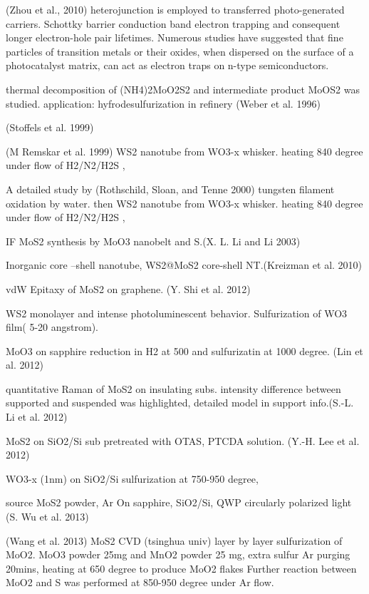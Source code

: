(Zhou et al., 2010) heterojunction is employed to transferred photo-generated carriers. Schottky barrier conduction band electron trapping and consequent longer electron-hole pair lifetimes. Numerous studies have suggested that fine particles of transition metals or their oxides, when dispersed on the surface of a photocatalyst matrix, can act as electron traps on n-type semiconductors.

thermal decomposition of (NH4)2MoO2S2 and intermediate product MoOS2 was studied. application: hyfrodesulfurization in refinery (Weber et al. 1996) \cite{Weber1996}

 (Stoffels et al. 1999)

(M Remskar et al. 1999) WS2 nanotube from WO3-x whisker. heating 840 degree under flow of H2/N2/H2S ,

A detailed study by (Rothschild, Sloan, and Tenne 2000) tungsten filament oxidation by water. then WS2 nanotube from WO3-x whisker. heating 840 degree under flow of H2/N2/H2S ,

IF MoS2 synthesis by MoO3 nanobelt and S.(X. L. Li and Li 2003)

Inorganic core –shell nanotube, WS2@MoS2 core-shell NT.(Kreizman et al. 2010)

vdW Epitaxy of MoS2 on graphene. (Y. Shi et al. 2012)

WS2 monolayer and intense photoluminescent behavior. Sulfurization of WO3 film( 5-20 angstrom).

MoO3 on sapphire reduction in H2 at 500 and sulfurizatin at 1000 degree. (Lin et al. 2012)

quantitative Raman of MoS2 on insulating subs. intensity difference between supported and suspended was highlighted, detailed model in support info.(S.-L. Li et al. 2012)

MoS2 on SiO2/Si sub pretreated with OTAS, PTCDA solution. (Y.-H. Lee et al. 2012)

WO3-x (1nm) on SiO2/Si sulfurization at 750-950 degree,\cite{Elias2013}

source MoS2 powder, Ar On sapphire, SiO2/Si, QWP circularly polarized  light (S. Wu et al. 2013)

(Wang et al. 2013) MoS2 CVD (tsinghua univ) layer by layer sulfurization of MoO2.
MoO3 powder 25mg and MnO2 powder 25 mg, extra sulfur Ar purging  20mins, heating at 650 degree to produce MoO2 flakes
Further reaction between MoO2 and S was performed at 850-950 degree under Ar flow.

